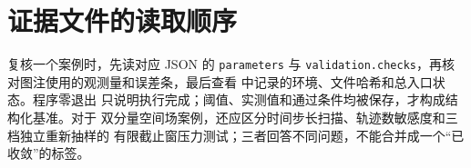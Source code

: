 \section{证据文件的读取顺序}

复核一个案例时，先读对应 JSON 的 \texttt{parameters} 与
\texttt{validation.checks}，再核对图注使用的观测量和误差条，最后查看
 中记录的环境、文件哈希和总入口状态。程序零退出
只说明执行完成；阈值、实测值和通过条件均被保存，才构成结构化基准。对于
双分量空间场案例，还应区分时间步长扫描、轨迹数敏感度和三档独立重新抽样的
有限截止窗压力测试；三者回答不同问题，不能合并成一个“已收敛”的标签。
